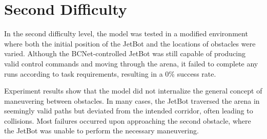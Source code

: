 \section{Second Difficulty}

In the second difficulty level, the model was tested in a modified environment where both the initial position of the JetBot and the locations of obstacles were varied. Although the BCNet-controlled JetBot was still capable of producing valid control commands and moving through the arena, it failed to complete any runs according to task requirements, resulting in a 0\% success rate.

Experiment results show that the model did not internalize the general concept of maneuvering between obstacles. In many cases, the JetBot traversed the arena in seemingly valid paths but deviated from the intended corridor, often leading to collisions. Most failures occurred upon approaching the second obstacle, where the JetBot was unable to perform the necessary maneuvering.
